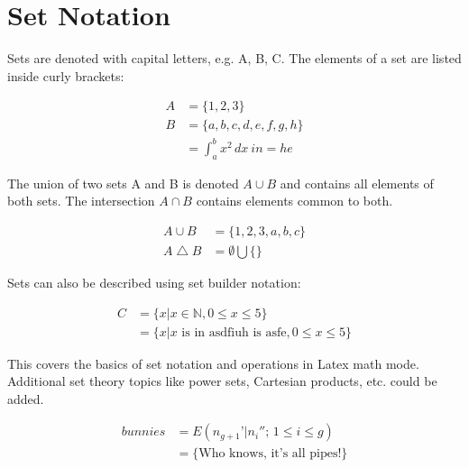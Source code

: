 \documentclass{article}
\begin{document}
\section{Set Notation}

Sets are denoted with capital letters, e.g. A, B, C. The elements of a set are listed inside curly brackets:

\begin{align}
A &= \{1, 2, 3\} \\
B &= \{a, b, c, d, e, f, g, h\} \\
&= \int_{a}^{b} x^2 \,dx\ in = he
\end{align}

The union of two sets A and B is denoted $A \cup B$ and contains all elements of both sets. The intersection $A \cap B$ contains elements common to both.

\begin{align}
A \cup B & = \{1, 2, 3, a, b, c\} \\
A \bigtriangleup B & = \emptyset \bigcup \{\}
\end{align}

Sets can also be described using set builder notation:

\begin{align}
C & = \{x | x \in \mathbb{N}, 0 \leq x \leq 5\} \\
& = \{x |\textrm{$x$ is in asdfiuh is asfe}, 0 \leq x \leq 5\}
\end{align}

This covers the basics of set notation and operations in Latex math mode. Additional set theory topics like power sets, Cartesian products, etc. could be added.

\begin{align}
bunnies & = E(n_{g+1}’|n_i'';\,1\le i\le g) \\
& = \{\textrm{Who knows, it's all pipes!}\}
\end{align}
\end{document}
